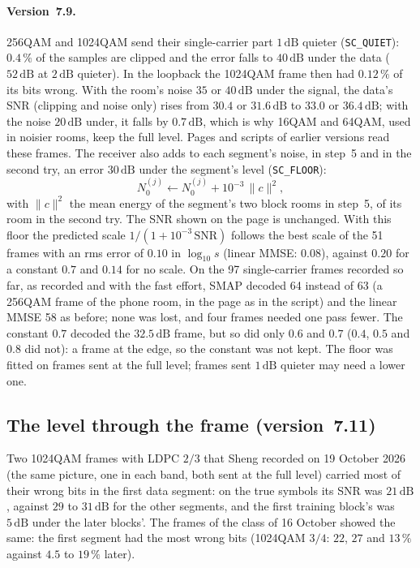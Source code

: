 \documentclass[11pt,a4paper]{article}
\newcommand{\dB}{\,\mathrm{dB}}
\newcommand{\code}[1]{\texttt{#1}}
\theoremstyle{remark}
\begin{document}
\paragraph{Version~7.9.} 256QAM and 1024QAM send their single-carrier part $1\dB$ quieter (\code{SC\_QUIET}): $0.4\,\%$ of the samples are clipped and the error falls to $40\dB$ under the data ($52\dB$ at $2\dB$ quieter). In the loopback the 1024QAM frame then had $0.12\,\%$ of its bits wrong. With the room's noise $35$ or $40\dB$ under the signal, the data's SNR (clipping and noise only) rises from $30.4$ or $31.6\dB$ to $33.0$ or $36.4\dB$; with the noise $20\dB$ under, it falls by $0.7\dB$, which is why 16QAM and 64QAM, used in noisier rooms, keep the full level. Pages and scripts of earlier versions read these frames. The receiver also adds to each segment's noise, in step~5 and in the second try, an error $30\dB$ under the segment's level (\code{SC\_FLOOR}):
\begin{equation}
N_0^{(j)} \leftarrow N_0^{(j)} + 10^{-3}\, \|c\|^2,
\end{equation}
with $\|c\|^2$ the mean energy of the segment's two block rooms in step~5, of its room in the second try. The SNR shown on the page is unchanged. With this floor the predicted scale $1/(1 + 10^{-3}\,\mathrm{SNR})$ follows the best scale of the 51 frames with an rms error of $0.10$ in $\log_{10} s$ (linear MMSE: $0.08$), against $0.20$ for a constant $0.7$ and $0.14$ for no scale. On the 97 single-carrier frames recorded so far, as recorded and with the fast effort, SMAP decoded 64 instead of 63 (a 256QAM frame of the phone room, in the page as in the script) and the linear MMSE 58 as before; none was lost, and four frames needed one pass fewer. The constant $0.7$ decoded the $32.5\dB$ frame, but so did only $0.6$ and $0.7$ ($0.4$, $0.5$ and $0.8$ did not): a frame at the edge, so the constant was not kept. The floor was fitted on frames sent at the full level; frames sent $1\dB$ quieter may need a lower one.

\subsection{The level through the frame (version~7.11)}
\label{sec:sclevel}
Two 1024QAM frames with LDPC $2/3$ that Sheng recorded on 19 October 2026 (the same picture, one in each band, both sent at the full level) carried most of their wrong bits in the first data segment: on the true symbols its SNR was $21\dB$, against $29$ to $31\dB$ for the other segments, and the first training block's was $5\dB$ under the later blocks'. The frames of the class of 16 October showed the same: the first segment had the most wrong bits (1024QAM $3/4$: $22$, $27$ and $13\,\%$ against $4.5$ to $19\,\%$ later).
\end{document}
